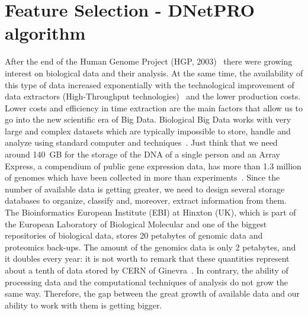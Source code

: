 \documentclass{standalone}
\begin{document}
\chapter[Feature Selection]{Feature Selection - DNetPRO algorithm}\label{chapter1:featsel}



After the end of the Human Genome Project (HGP, 2003)~\cite{McKinney2012} there were growing interest on biological data and their analysis.
At the same time, the availability of this type of data increased exponentially with the technological improvement of data extractors (High-Throughput technologies)~\cite{Reuter2015} and the lower production costs.
Lower costs and efficiency in time extraction are the main factors that allow us to go into the new scientific era of Big Data.
Biological Big Data works with very large and complex datasets which are typically impossible to store, handle and analyze using standard computer and techniques~\cite{Kumari2014}.
Just think that we need around 140~GB for the storage of the DNA of a single person and an Array Express, a compendium of public gene expression data, has more than 1.3 million of genomes which have been collected in more than  experiments~\cite{Greene2014}.
Since the number of available data is getting greater, we need to design several storage databases to organize, classify and, moreover, extract information from them.
The Bioinformatics European Institute (EBI) at Hinxton (UK), which is part of the European Laboratory of Biological Molecular and one of the biggest repositories of biological data, stores 20 petabytes of genomic data and proteomics back-ups.
The amount of the genomics data is only 2 petabytes, and it doubles every year: it is not worth to remark that these quantities represent about a tenth of data stored by CERN of Ginevra~\cite{Marx2013}.
In contrary, the ability of processing data and the computational techniques of analysis do not grow the same way.
Therefore, the gap between the great growth of available data and our ability to work with them is getting bigger.
\end{document}
